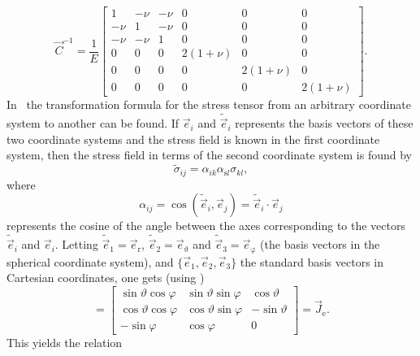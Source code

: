 \begin{equation}
	\vec{C}^{-1} = \frac{1}{E}\begin{bmatrix}
		1 & -\nu & -\nu & 0 & 0 & 0\\
		-\nu & 1 & -\nu & 0 & 0 & 0\\
		-\nu & -\nu & 1 & 0 & 0 & 0\\
		0 & 0 & 0 & 2(1+\nu) & 0 & 0\\
		0 & 0 & 0 & 0 & 2(1+\nu) & 0\\
		0 & 0 & 0 & 0 & 0 & 2(1+\nu)
	\end{bmatrix}.
\end{equation}
In~\cite[p. 19]{Gould1994itl} the transformation formula for the stress tensor from an arbitrary coordinate system to another can be found. If $\vec{e}_i$ and $\tilde{\vec{e}}_i$ represents the basis vectors of these two coordinate systems and the stress field is known in the first coordinate system, then the stress field in terms of the second coordinate system is found by
\begin{equation}
	\tilde{\sigma}_{ij} = \alpha_{ik}\alpha_{\mathrm{s}l}\sigma_{kl},
\end{equation}
where
\begin{equation}
	\alpha_{ij} = \cos(\tilde{\vec{e}}_i, \vec{e}_j) = \tilde{\vec{e}}_i\cdot\vec{e}_j
\end{equation}
represents the cosine of the angle between the axes corresponding to the vectors $\tilde{\vec{e}}_i$ and $\vec{e}_i$. Letting $\tilde{\vec{e}}_1 = \vec{e}_{\mathrm{r}}$, $\tilde{\vec{e}}_2 = \vec{e}_\upvartheta$ and $\tilde{\vec{e}}_3 = \vec{e}_\upvarphi$ (the basis vectors in the spherical coordinate system), and $\{\vec{e}_1, \vec{e}_2, \vec{e}_3\}$ the standard basis vectors in Cartesian coordinates, one gets (using )
\begin{equation}
	[\alpha_{ij}] = \begin{bmatrix}
	\sin\vartheta\cos\varphi & \sin\vartheta\sin\varphi & \cos\vartheta\\
	\cos\vartheta\cos\varphi & \cos\vartheta\sin\varphi & -\sin\vartheta\\
	-\sin\varphi & \cos\varphi & 0
	\end{bmatrix} = \vec{J}_{\mathrm{e}}.
\end{equation}
This yields the relation
